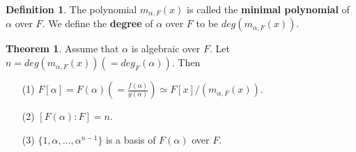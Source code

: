 \documentclass{article}
\theoremstyle{definition}
\newtheorem{thm}{Theorem}
\newtheorem{dfn}{Definition}
\begin{document}
\begin{dfn}
	The polynomial $m_{\alpha, F}(x)$ is called the \textbf{minimal polynomial} of $\alpha$ over $F$.
	We define the \textbf{degree} of $\alpha$ over $F$ to be $deg(m_{\alpha, F}(x))$.
\end{dfn}

\begin{thm}
	Assume that $\alpha$ is algebraic over $F$.
	Let $n = deg(m_{\alpha, F}(x)) (= deg_{F}(\alpha))$.
	Then 
	\begin{enumerate}
		\item[(1)] $F[\alpha] = F(\alpha)\left( = \frac{f(\alpha)}{g(\alpha)}\right) \simeq F[x]/(m_{\alpha, F}(x))$.

		\item[(2)] $[F(\alpha):F] = n$.

		\item[(3)] $\{1, \alpha, ..., \alpha^{n - 1}\}$ is a basis of $F(\alpha)$ over $F$.
	\end{enumerate}
\end{thm}
\end{document}
